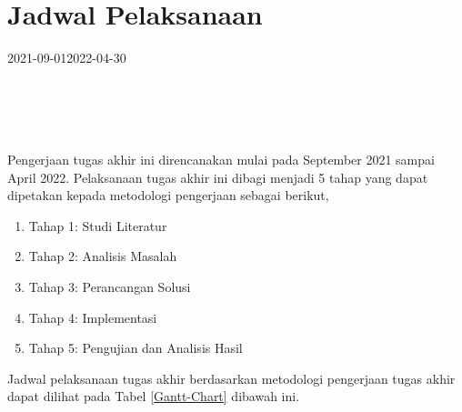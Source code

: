 \section{Jadwal Pelaksanaan}
 
 \newsavebox\mybox
 \begin{lrbox}{\mybox}
	     \begin{ganttchart}[
		     vgrid={*{6}{draw=none}, dotted},
		     x unit=.05cm,
		     y unit title=.6cm,
		     y unit chart=.6cm,
		     time slot format=isodate,
		     time slot format/start date=2016-09-01]{2021-09-01}{2022-04-30}
		      \\
		     \\
		     \\
		     \\
		     \\
		     \end{ganttchart}
	 \end{lrbox}

 Pengerjaan tugas akhir ini direncanakan mulai pada September 2021 sampai April 2022. Pelaksanaan tugas akhir ini dibagi menjadi 5 tahap yang dapat dipetakan kepada metodologi pengerjaan sebagai berikut,
 \begin{enumerate}
	     \item Tahap 1: Studi Literatur
	     \item Tahap 2: Analisis Masalah
	     \item Tahap 3: Perancangan Solusi
	     \item Tahap 4: Implementasi
	     \item Tahap 5: Pengujian dan Analisis Hasil
	 \end{enumerate}
 
 Jadwal pelaksanaan tugas akhir berdasarkan metodologi pengerjaan tugas akhir dapat dilihat pada Tabel \ref{Gantt-Chart} dibawah ini.
 \begin{table}[htb]
	 \centering
	 \caption{Gantt Chart jadwal pelaksanaan tugas akhir}
	 \label{Gantt-Chart}
	 \end{table}



